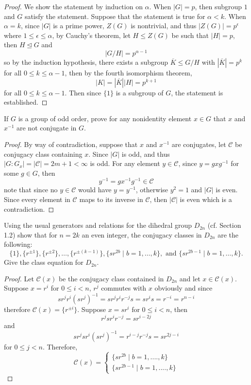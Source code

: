 \documentclass{article}
\newenvironment{problem}[2][Problem]{\begin{trivlist}
\item[\hskip \labelsep {\bfseries #1}\hskip \labelsep {\bfseries #2.}]}{\end{trivlist}}
\begin{document}
\begin{proof}
    We show the statement by induction on $\alpha$. When $|G|=p$, then subgroup $1$ and $G$ satisfy the statement. Suppose that the statement is true for $\alpha<k$. When $\alpha=k$, since $|G|$ is a prime power, $Z(G)$ is nontrivial, and thus $|Z(G)|=p^{\epsilon}$ where $1\leq \epsilon \leq \alpha$, by Cauchy's theorem, let $H\leq Z(G)$ be such that $|H|=p$, then $H\trianglelefteq G$ and \[         |G/H| = p^{\alpha-1}     \] so by the induction hypothesis, there exists a subgroup $\overline{K}\leq G/H$ with $|\overline{K}|=p^k$ for all $0\leq k\leq \alpha-1$, then by the fourth isomorphism theorem, 
    \[
        |K|=|\overline{K}||H|=p^{k+1}
    \] for all $0\leq k\leq \alpha-1$. Then since $\{1\}$ is a subgroup of $G$, the statement is established. 
\end{proof}
\begin{problem}{30}
     If \( G \) is a group of odd order, prove for any nonidentity element \( x \in G \) that \( x \) and \( x^{-1} \) are not conjugate in \( G \).
\end{problem}
\begin{proof}
    By way of contradiction, suppose that $x$ and $x^{-1}$ are conjugates, let $\mathcal{C}$ be conjugacy class containing $x$. Since $|G|$ is odd, 
    and thus
    $|G:G_x| = |\mathcal{C}|=2m+1<\infty$ is odd. For any element $y\in \mathcal{C}$, since $y =gxg^{-1}$ for some $g \in G$, then
    \[
    y^{-1}=gx^{-1}g^{-1}\in \mathcal{C}
    \]
    note that since no $y\in \mathcal{C}$ would have $y=y^{-1}$, otherwise $y^2=1$ and $|G|$ is even. Since every element in $\mathcal{C}$ maps to its inverse in $\mathcal{C}$, then $ |\mathcal{C}|$ is even which is a contradiction.
\end{proof}
\begin{problem}{31}
     Using the usual generators and relations for the dihedral group \( D_{2n} \) (cf. Section 1.2) show that for \( n = 2k \) an even integer, the conjugacy classes in \( D_{2n} \) are the following: 
    \[
    \{1\}, \{r^{\pm 1}\}, \{r^{\pm 2}\}, \ldots, \{r^{\pm (k-1)}\}, \{sr^{2b} \mid b = 1, \ldots, k\}, \text{ and } \{sr^{2b-1} \mid b = 1, \ldots, k\}.
    \]
    Give the class equation for \( D_{2n} \).
\end{problem}
\begin{proof}
    Let $\mathcal{C}(x)$ be the conjugacy class contained in $D_{2n}$ and let $x \in \mathcal{C}(x)$. Suppose $x=r^i$ for $0\leq i <n$, $r^j$ commutes with $x$ obviously and since \[         sr^jr^i(sr^j)^{-1}=sr^jr^ir^{-j}s=sr^is=r^{-i}=r^{n-i}     \] therefore $\mathcal{C}(x)=\{r^{\pm i}\}$. Suppose $x =sr^i$ for $0\leq i <n$, then
    \[
        r^jsr^ir^{-j}=sr^{i-2j}
    \]
    and 
    \[
    sr^jsr^i(sr^{j})^{-1}=r^{i-j}r^{-j}s=sr^{2j-i}
    \]
    for $0\leq j<n$. Therefore, 
    \[
    \mathcal{C}(x)=\begin{cases}
        \{sr^{2b}\mid b =1, ...., k\}\\
        \{sr^{2b-1}\mid b =1, ...., k\}
    \end{cases}
    \]
\end{proof}
\end{document}
